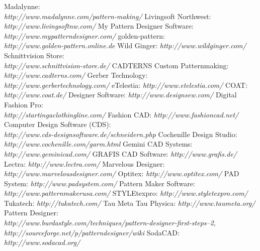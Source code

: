 \documentclass[10pt,letterpaper]{ltugboat}
\begin{document}
\begin{thebibliography}{99}
 Madalynne:\\ \textit{http://www.madalynne.com/pattern-making/}
 Livingsoft Northwest:\\ \textit{http://www.livingsoftnw.com/}
 My Pattern Designer Software:\\ \textit{http://www.mypatterndesigner.com/‎}
 golden-pattern:\\ \textit{http://www.golden-pattern.online.de}
 Wild Ginger: \textit{http://www.wildginger.com/}
 Schnittvision Store:\\ \textit{http://www.schnittvision-store.de/}
 CADTERNS Custom Patternmaking:\\ \textit{http://www.cadterns.com/}
 Gerber Technology:\\ \textit{http://www.gerbertechnology.com/}
 eTelestia: \textit{http://www.etelestia.com/}
 COAT: \textit{http://www.coat.de/}
 Designer Software: \textit{http://www.designsew.com/}
 Digital Fashion Pro:\\ \textit{http://startingaclothingline.com/}
 Fashion CAD: \textit{http://www.fashioncad.net/}
 Computer Design Software (CDS):\\ \textit{http://www.cds-designsoftware.de/schneidern.php}
 Cochenille Design Studio:\\ \textit{http://www.cochenille.com/garm.html}
 Gemini CAD Systems:\\ \textit{http://www.geminicad.com/}
 GRAFIS CAD Software: \textit{http://www.grafis.de/}
 Lectra: \textit{http://www.lectra.com/}
 Marvelous Designer:\\ \textit{http://www.marvelousdesigner.com/}
 Optitex: \textit{http://www.optitex.com/}
 PAD System: \textit{http://www.padsystem.com/}
 Pattern Maker Software:\\ \textit{http://www.patternmakerusa.com/}
 STYLEtexpro: \textit{http://www.styletexpro.com/}
 Tukatech: \textit{http://tukatech.com/}
 Tau Meta Tau Physica: \textit{http://www.taumeta.org/}
 Pattern Designer:\\ \textit{http://www.burdastyle.com/techniques/pattern-designer-first-steps--2},\\
\textit{http://sourceforge.net/p/patterndesigner/wiki}
 SodaCAD: \textit{http://www.sodacad.org/}
\end{thebibliography}
\end{document}
